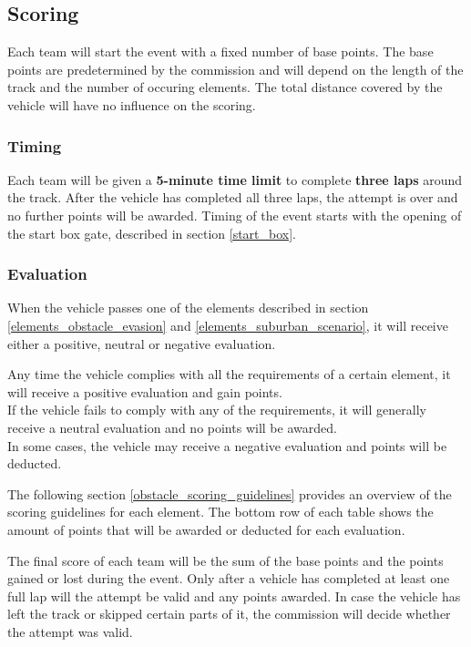 \subsection{Scoring}{
	\label{obstacle_scoring}

	\renewcommand*\footnoterule{} %
	\newcommand{\topstrut}{\rule{0pt}{3.5ex}}

	Each team will start the event with a fixed number of base points. The base
	points are predetermined by the commission and will depend on the length of the
	track and the number of occuring elements. The total distance covered by the
	vehicle will have no influence on the scoring.

	\subsubsection{Timing}
	Each team will be given a \textbf{5-minute time limit} to complete
	\textbf{three laps} around the track. After the vehicle has completed all three
	laps, the attempt is over and no further points will be awarded. Timing of the
	event starts with the opening of the start box gate, described in section
	\ref{start_box}.

	\subsubsection{Evaluation}
	When the vehicle passes one of the elements described in section
	\ref{elements_obstacle_evasion} and \ref{elements_suburban_scenario}, it will
	receive either a positive, neutral or negative evaluation.

	Any time the vehicle complies with all the requirements of a certain element,
	it will receive a positive evaluation and gain points.\\ If the vehicle fails
	to comply with any of the requirements, it will generally receive a neutral
	evaluation and no points will be awarded.\\ In some cases, the vehicle may
	receive a negative evaluation and points will be deducted.

	The following section \ref{obstacle_scoring_guidelines} provides an overview of
	the scoring guidelines for each element. The bottom row of each table shows the
	amount of points that will be awarded or deducted for each evaluation.

	The final score of each team will be the sum of the base points and the points
	gained or lost during the event. Only after a vehicle has completed at least
	one full lap will the attempt be valid and any points awarded. In case the
	vehicle has left the track or skipped certain parts of it, the commission will
	decide whether the attempt was valid.

}
